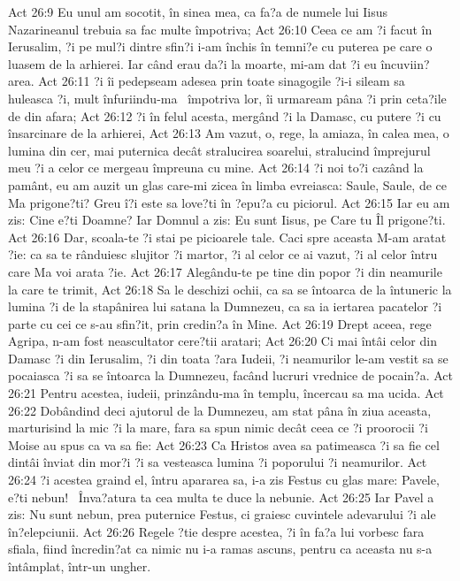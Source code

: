 Act 26:9  Eu unul am socotit, în sinea mea, ca fa?a de numele lui Iisus Nazarineanul trebuia sa fac multe împotriva;
Act 26:10  Ceea ce am ?i facut în Ierusalim, ?i pe mul?i dintre sfin?i i-am închis în temni?e cu puterea pe care o luasem de la arhierei. Iar când erau da?i la moarte, mi-am dat ?i eu încuviin?area.
Act 26:11  ?i îi pedepseam adesea prin toate sinagogile ?i-i sileam sa huleasca ?i, mult înfuriindu-ma  împotriva lor, îi urmaream pâna ?i prin ceta?ile de din afara;
Act 26:12  ?i în felul acesta, mergând ?i la Damasc, cu putere ?i cu însarcinare de la arhierei,
Act 26:13  Am vazut, o, rege, la amiaza, în calea mea, o lumina din cer, mai puternica decât stralucirea soarelui, stralucind împrejurul meu ?i a celor ce mergeau împreuna cu mine.
Act 26:14  ?i noi to?i cazând la pamânt, eu am auzit un glas care-mi zicea în limba evreiasca: Saule, Saule, de ce Ma prigone?ti? Greu î?i este sa love?ti în ?epu?a cu piciorul.
Act 26:15  Iar eu am zis: Cine e?ti Doamne? Iar Domnul a zis: Eu sunt Iisus, pe Care tu Îl prigone?ti.
Act 26:16  Dar, scoala-te ?i stai pe picioarele tale. Caci spre aceasta M-am aratat ?ie: ca sa te rânduiesc slujitor ?i martor, ?i al celor ce ai vazut, ?i al celor întru care Ma voi arata ?ie.
Act 26:17  Alegându-te pe tine din popor ?i din neamurile la care te trimit,
Act 26:18  Sa le deschizi ochii, ca sa se întoarca de la întuneric la lumina ?i de la stapânirea lui satana la Dumnezeu, ca sa ia iertarea pacatelor ?i parte cu cei ce s-au sfin?it, prin credin?a în Mine.
Act 26:19  Drept aceea, rege Agripa, n-am fost neascultator cere?tii aratari;
Act 26:20  Ci mai întâi celor din Damasc ?i din Ierusalim, ?i din toata ?ara Iudeii, ?i neamurilor le-am vestit sa se pocaiasca ?i sa se întoarca la Dumnezeu, facând lucruri vrednice de pocain?a.
Act 26:21  Pentru acestea, iudeii, prinzându-ma în templu, încercau sa ma ucida.
Act 26:22  Dobândind deci ajutorul de la Dumnezeu, am stat pâna în ziua aceasta, marturisind la mic ?i la mare, fara sa spun nimic decât ceea ce ?i proorocii ?i Moise au spus ca va sa fie:
Act 26:23  Ca Hristos avea sa patimeasca ?i sa fie cel dintâi înviat din mor?i ?i sa vesteasca lumina ?i poporului ?i neamurilor.
Act 26:24  ?i acestea graind el, întru apararea sa, i-a zis Festus cu glas mare: Pavele, e?ti nebun!  Înva?atura ta cea multa te duce la nebunie.
Act 26:25  Iar Pavel a zis: Nu sunt nebun, prea puternice Festus, ci graiesc cuvintele adevarului ?i ale în?elepciunii.
Act 26:26  Regele ?tie despre acestea, ?i în fa?a lui vorbesc fara sfiala, fiind încredin?at ca nimic nu i-a ramas ascuns, pentru ca aceasta nu s-a întâmplat, într-un ungher.
